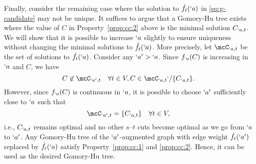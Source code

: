 \begin{Proof}
  Finally, consider the remaining case where the solution to $\hat{f}_t(`a)$ in \eqref{eq:g-candidate} may not be unique. It suffices to argue that a Gomory-Hu tree exists where the value of $C$ in Property~\ref{prop:cc:2} above is the minimal solution $C_{`a,t}$. We will show that it is possible to increase $`a$ slightly to ensure uniqueness without changing the minimal solutions to $\hat{f}_t(`a)$. More precisely, let $\mcC_{`a,t}$ be the set of solutions to $\hat{f}_t(`a)$. Consider any $`a'>`a$. Since $f_{`a}(C)$ is increasing in $`a$ and $C$, we have
  \[C\not\in \mcC_{`a',t}\quad \forall t\in V, C\in \mcC_{`a,t}`/\Set{C_{`a,t}}.\]
  However, since $f_{`a}(C)$ is continuous in $`a$, it is possible to choose $`a'$ sufficiently close to $`a$ such that
  \[ \mcC_{`a',t} = \Set{C_{`a,t}} \quad \forall t\in V,\] 
  i.e., $C_{`a,t}$ remains optimal and no other $s$--$t$ cuts become optimal as we go from $`a$ to $`a'$. Any Gomory-Hu tree of the $`a'$-augmented graph with edge weight $\hat{f}_t(`a')$ replaced by $\hat{f}_t(`a)$ satisfy Property~\ref{prop:cc:1} and \ref{prop:cc:2}. Hence, it can be used as the desired Gomory-Hu tree.
\end{Proof}


